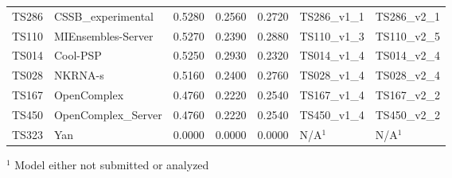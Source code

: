 \begin{table}[ht]
{\begin{tabular}{llrrrll}
TS286 & CSSB\_experimental & 0.5280 & 0.2560 & 0.2720 & TS286\_v1\_1 & TS286\_v2\_1 \\ 
TS110 & MIEnsembles-Server & 0.5270 & 0.2390 & 0.2880 & TS110\_v1\_3 & TS110\_v2\_5 \\ 
TS014 & Cool-PSP & 0.5250 & 0.2930 & 0.2320 & TS014\_v1\_4 & TS014\_v2\_4 \\ 
TS028 & NKRNA-s & 0.5160 & 0.2400 & 0.2760 & TS028\_v1\_4 & TS028\_v2\_4 \\ 
TS167 & OpenComplex & 0.4760 & 0.2220 & 0.2540 & TS167\_v1\_4 & TS167\_v2\_2 \\ 
TS450 & OpenComplex\_Server & 0.4760 & 0.2220 & 0.2540 & TS450\_v1\_4 & TS450\_v2\_2 \\ 
TS323 & Yan & 0.0000 & 0.0000 & 0.0000 & N/A$^{1}$ & N/A$^{1}$ \\ 
\bottomrule
\end{tabular}%
}
\begin{flushleft}\footnotesize $^{1}$ Model either not submitted or analyzed\end{flushleft}
\end{table}
